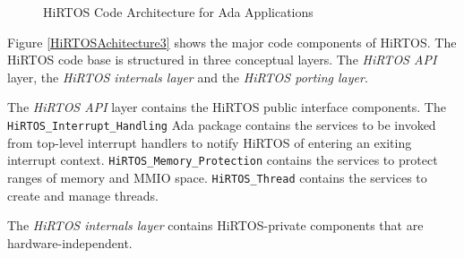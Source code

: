 \documentclass{AUJarticle}
\begin{document}
\begin{figure}
   \begin{center}
   \end{center}
   \caption{HiRTOS Code Architecture for Ada Applications}
   \label{HiRTOSAchitecture2}
\end{figure}

Figure \ref{HiRTOSAchitecture3} shows the major code components of HiRTOS. The HiRTOS code base is
structured in three conceptual layers. The \emph{HiRTOS API} layer, the \emph{HiRTOS internals layer}
and the \emph{HiRTOS porting layer}.

The \emph{HiRTOS API} layer contains the HiRTOS public interface components.
The \verb'HiRTOS_Interrupt_Handling' Ada package contains the services to be invoked from top-level
interrupt handlers to notify HiRTOS of entering an exiting interrupt context.
\verb'HiRTOS_Memory_Protection' contains the services to protect ranges of memory and MMIO space.
\verb'HiRTOS_Thread' contains the services to create and manage threads.

The \emph{HiRTOS internals layer} contains HiRTOS-private components that are
hardware-independent.
\end{document}
